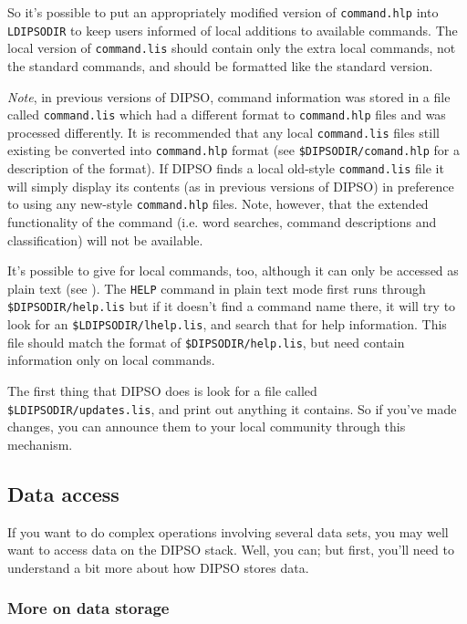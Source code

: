 \documentclass[twoside,11pt,noabs,nolof]{starlink}
\begin{document}
So it's possible to put an appropriately modified version of
{\texttt{command.hlp}}  into {\texttt{LDIPSODIR}}  to keep users informed of local
additions to available commands. The local version of {\texttt{command.lis}}
should contain only the extra local commands, not the standard commands,
and should be formatted like the standard version.

\emph{Note}, in previous versions of DIPSO, command information was stored
in a file called {\texttt{command.lis}}  which had a different format to
{\texttt{command.hlp}}  files and was processed differently. It is recommended that
any local {\texttt{command.lis}}  files still existing be converted into
{\texttt{command.hlp}}  format (see {\texttt{\$DIPSODIR/comand\-.hlp}}  for a description
of the format). If DIPSO finds a local old-style {\texttt{command.lis}}  file
it will simply display its contents (as in previous versions of DIPSO) in
preference to using any new-style {\texttt{command.hlp}}  files. Note, however,
that the extended functionality of the 
command (i.e. word searches, command descriptions and classification) will not be available.

It's possible to give  for local commands,
too, although it can only be accessed as plain text (see
). The {\texttt{HELP}} command in plain
text mode first
runs through {\texttt{\$DIPSO\-DIR/help\-.lis}}  but if it doesn't find a
command name there, it will try to look for an {\texttt{\$LDIPSODIR/lhelp.lis}},
and search that for help information. This file should match the format
of {\texttt{\$DIPSODIR/help.lis}},  but need contain information only on local
commands.

The first thing that DIPSO does is look for a file called
{\texttt{\$LDIPSODIR/updates.lis}},  and print out anything it contains. So if
you've made changes, you can announce them to your local community
through this mechanism.

\subsection {Data access}

If you want to do complex operations involving several data sets, you
may well want to access data on the DIPSO stack. Well, you can; but
first, you'll need to understand a bit more about how DIPSO stores
data.

\subsubsection {\label{SEC:WRNDF}More on data storage}
\end{document}

